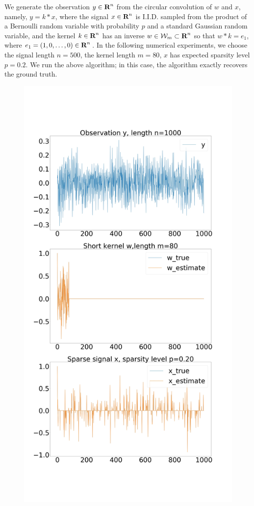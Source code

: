 \documentclass[12pt]{article}
\begin{document}
We generate the observation $y\in {\mbox{\bf R}}^n$ from the circular convolution of $w$ and $x$, namely,  $y = k*x$, 
where the signal $x\in {\mbox{\bf R}}^n$ is I.I.D. sampled from the product of a Bernoulli random variable with probability $p$ and a standard Gaussian random variable,
 and the kernel $k\in {\mbox{\bf R}}^n$ has an inverse $w\in \mathcal W_m \subset {\mbox{\bf R}}^n$ so that $w*k = e_1$,
  where $e_1=(1,0,\ldots, 0)\in {\mbox{\bf R}}^n$. 
  In the following numerical experiments, we choose the signal length $n=500$, the kernel length $m= 80$, $x$ has expected sparsity level $p=0.2$. 
  We run the above algorithm; in this case, the algorithm exactly recovers the ground truth.
\begin{figure}
 \includegraphics[width=12cm,keepaspectratio]{figures/bShort_lenKnown_xSparse_w_Gaus_Ano_n1000_k80_p0_20_sigma0_00.jpg}
\end{figure}
 
\end{document}
